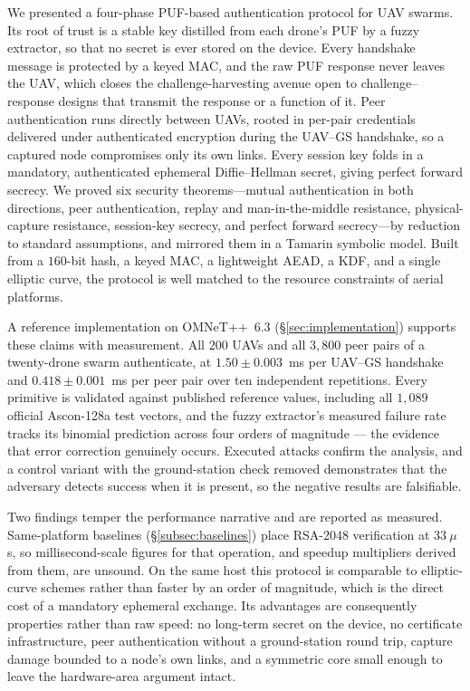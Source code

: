 \documentclass[11pt,a4paper]{article}
\begin{document}
We presented a four-phase PUF-based authentication protocol for UAV swarms. Its
root of trust is a stable key distilled from each drone's PUF by a fuzzy
extractor, so that no secret is ever stored on the device. Every handshake
message is protected by a keyed MAC, and the raw PUF response never leaves the
UAV, which closes the challenge-harvesting avenue open to challenge--response
designs that transmit the response or a function of it. Peer authentication runs directly between UAVs, rooted in per-pair
credentials delivered under authenticated encryption during the UAV--GS
handshake, so a captured node compromises only its own links. Every session key
folds in a mandatory, authenticated ephemeral Diffie--Hellman secret, giving
perfect forward secrecy. We proved six security theorems---mutual authentication
in both directions, peer authentication, replay and man-in-the-middle
resistance, physical-capture resistance, session-key secrecy, and perfect
forward secrecy---by reduction to standard assumptions, and mirrored them in a
Tamarin symbolic model. Built from a $160$-bit hash, a keyed MAC, a lightweight
AEAD, a KDF, and a single elliptic curve, the protocol is well matched to the
resource constraints of aerial platforms.

A reference implementation on OMNeT++~6.3 (\S\ref{sec:implementation}) supports
these claims with measurement. All $200$ UAVs and all $3{,}800$ peer pairs of a
twenty-drone swarm authenticate, at $1.50 \pm 0.003$~ms per UAV--GS handshake and
$0.418 \pm 0.001$~ms per peer pair over ten independent repetitions. Every
primitive is validated against published reference values, including all $1{,}089$
official Ascon-128a test vectors, and the fuzzy extractor's measured failure rate
tracks its binomial prediction across four orders of magnitude --- the evidence
that error correction genuinely occurs. Executed attacks
confirm the analysis, and a control variant with the ground-station check removed
demonstrates that the adversary detects success when it is present, so the negative
results are falsifiable.

Two findings temper the performance narrative and are reported as measured.
Same-platform baselines (\S\ref{subsec:baselines}) place RSA-2048 verification at
$33~\mu$s, so millisecond-scale figures for that operation, and speedup
multipliers derived from them, are unsound. On the same host this protocol is
comparable to elliptic-curve schemes rather than faster by an order of magnitude,
which is the direct cost of a mandatory ephemeral exchange. Its advantages are
consequently properties rather than raw speed: no long-term secret on the device,
no certificate infrastructure, peer authentication without a ground-station round
trip, capture damage bounded to a node's own links, and a symmetric core small
enough to leave the hardware-area argument intact.
\end{document}
